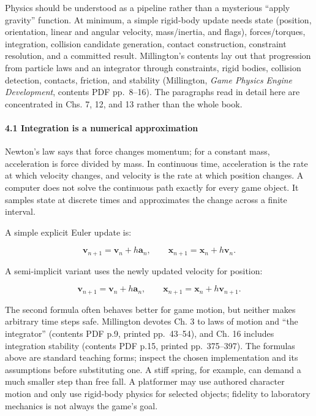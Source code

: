 Physics should be understood as a pipeline rather than a mysterious ``apply gravity'' function. At minimum, a simple rigid-body update needs state (position, orientation, linear and angular velocity, mass/inertia, and flags), forces/torques, integration, collision candidate generation, contact construction, constraint resolution, and a committed result. Millington's contents lay out that progression from particle laws and an integrator through constraints, rigid bodies, collision detection, contacts, friction, and stability (Millington, \emph{Game Physics Engine Development}, contents PDF pp.~8--16). The paragraphs read in detail here are concentrated in Chs. 7, 12, and 13 rather than the whole book.

\paragraph{4.1 Integration is a numerical approximation}\label{06-engine-ii-ch033-integration-is-a-numerical-approximation}

\hypertarget{06-engine-ii-ch033-integration-is-a-numerical-approximation}{}

Newton's law says that force changes momentum; for a constant mass, acceleration is force divided by mass. In continuous time, acceleration is the rate at which velocity changes, and velocity is the rate at which position changes. A computer does not solve the continuous path exactly for every game object. It samples state at discrete times and approximates the change across a finite interval.

A simple explicit Euler update is:

\[
\mathbf{v}_{n+1}=\mathbf{v}_n+h\mathbf{a}_n,
\qquad
\mathbf{x}_{n+1}=\mathbf{x}_n+h\mathbf{v}_n.
\]

A semi-implicit variant uses the newly updated velocity for position:

\[
\mathbf{v}_{n+1}=\mathbf{v}_n+h\mathbf{a}_n,
\qquad
\mathbf{x}_{n+1}=\mathbf{x}_n+h\mathbf{v}_{n+1}.
\]

The second formula often behaves better for game motion, but neither makes arbitrary time steps safe. Millington devotes Ch. 3 to laws of motion and ``the integrator'' (contents PDF p.9, printed pp.~43--54), and Ch. 16 includes integration stability (contents PDF p.15, printed pp.~375--397). The formulas above are standard teaching forms; inspect the chosen implementation and its assumptions before substituting one. A stiff spring, for example, can demand a much smaller step than free fall. A platformer may use authored character motion and only use rigid-body physics for selected objects; fidelity to laboratory mechanics is not always the game's goal.

